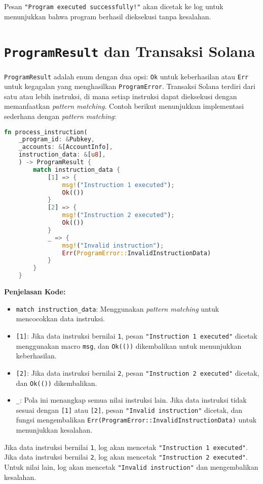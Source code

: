 Pesan \texttt{"Program executed successfully!"} akan dicetak ke log untuk menunjukkan bahwa program berhasil dieksekusi tanpa kesalahan.

\section{\texttt{ProgramResult} dan Transaksi Solana}

\texttt{ProgramResult} adalah enum dengan dua opsi: \texttt{Ok} untuk keberhasilan atau \texttt{Err} untuk kegagalan yang menghasilkan \texttt{ProgramError}. Transaksi Solana terdiri dari satu atau lebih instruksi, di mana setiap instruksi dapat dieksekusi dengan memanfaatkan \textit{pattern matching}. Contoh berikut menunjukkan implementasi sederhana dengan \textit{pattern matching}:

\begin{lstlisting}[language=Rust, caption={Implementasi \texttt{ProgramResult} dan Instruksi}]
	fn process_instruction(
	_program_id: &Pubkey,
	_accounts: &[AccountInfo],
	instruction_data: &[u8],
	) -> ProgramResult {
		match instruction_data {
			[1] => {
				msg!("Instruction 1 executed");
				Ok(())
			}
			[2] => {
				msg!("Instruction 2 executed");
				Ok(())
			}
			_ => {
				msg!("Invalid instruction");
				Err(ProgramError::InvalidInstructionData)
			}
		}
	}
\end{lstlisting}

\textbf{Penjelasan Kode:}
\begin{itemize}
	\item \texttt{match instruction\_data}: Menggunakan \textit{pattern matching} untuk mencocokkan data instruksi.
	\item \texttt{[1]}: Jika data instruksi bernilai \texttt{1}, pesan \texttt{"Instruction 1 executed"} dicetak menggunakan macro \texttt{msg}, dan \texttt{Ok(())} dikembalikan untuk menunjukkan keberhasilan.
	\item \texttt{[2]}: Jika data instruksi bernilai \texttt{2}, pesan \texttt{"Instruction 2 executed"} dicetak, dan \texttt{Ok(())} dikembalikan.
	\item \texttt{\_}: Pola ini menangkap semua nilai instruksi lain. Jika data instruksi tidak sesuai dengan \texttt{[1]} atau \texttt{[2]}, pesan \texttt{"Invalid instruction"} dicetak, dan fungsi mengembalikan \texttt{Err(ProgramError::InvalidInstructionData)} untuk menunjukkan kesalahan.
\end{itemize}

Jika data instruksi bernilai \texttt{1}, log akan mencetak \texttt{"Instruction 1 executed"}. Jika data instruksi bernilai \texttt{2}, log akan mencetak \texttt{"Instruction 2 executed"}. Untuk nilai lain, log akan mencetak \texttt{"Invalid instruction"} dan mengembalikan kesalahan.
